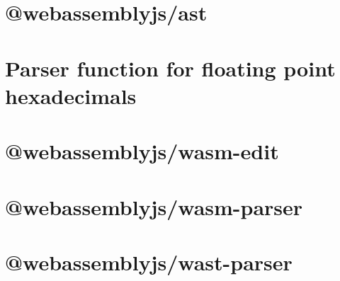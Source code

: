 \documentclass[twoside]{book}
\newcommand{\+}{\discretionary{\mbox{\scriptsize$\hookleftarrow$}}{}{}}
\begin{document}
\chapter{@webassemblyjs/ast}
\label{md__c___users_vaishnavi_jadhav__desktop__developer_code_mean_stack_example_client_node_modules__webassemblyjs_ast__r_e_a_d_m_e}

\chapter{Parser function for floating point hexadecimals}
\label{md__c___users_vaishnavi_jadhav__desktop__developer_code_mean_stack_example_client_node_modules__6c6f9eca5121117ae81a665364717b20}

\chapter{@webassemblyjs/wasm-\/edit}
\label{md__c___users_vaishnavi_jadhav__desktop__developer_code_mean_stack_example_client_node_modules__fcae7481eef301f0d5f997ca04f0db6c}

\chapter{@webassemblyjs/wasm-\/parser}
\label{md__c___users_vaishnavi_jadhav__desktop__developer_code_mean_stack_example_client_node_modules__08735235ce930565cf4a57c469f69526}

\chapter{@webassemblyjs/wast-\/parser}
\label{md__c___users_vaishnavi_jadhav__desktop__developer_code_mean_stack_example_client_node_modules__c31f34da7f03c345564d0c17a9e0e6c0}

\end{document}
